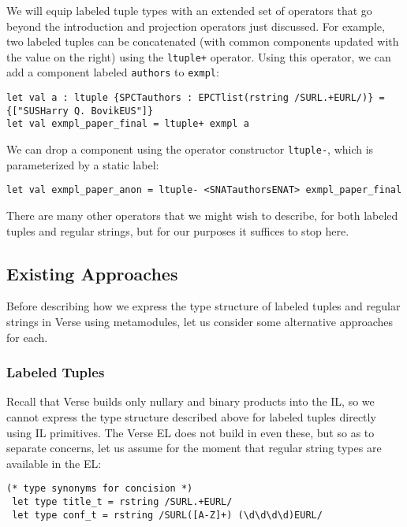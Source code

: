 We will equip labeled tuple types with an extended set of operators that go beyond the introduction and projection operators just discussed. For example, two labeled tuples can be concatenated (with common components updated with the value on the right) using the \lstinline{ltuple+} operator. Using this operator, we can add a component labeled \lstinline{authors} to \lstinline{exmpl}:
\begin{lstlisting}[numbers=none]
let val a : ltuple {SPCTauthors : EPCTlist(rstring /SURL.+EURL/)} = {["SUSHarry Q. BovikEUS"]}
let val exmpl_paper_final = ltuple+ exmpl a
\end{lstlisting}
We can drop a component using the operator constructor \lstinline{ltuple-}, which is parameterized by a static label:
\begin{lstlisting}[numbers=none]
let val exmpl_paper_anon = ltuple- <SNATauthorsENAT> exmpl_paper_final
\end{lstlisting}
There are many other operators that we might wish to describe, for both labeled tuples and regular strings, but for our purposes it suffices to stop here.

\subsection{Existing Approaches}\label{sec:metamodules-related}
Before describing how we express the type structure of labeled tuples and regular strings in Verse using metamodules, let us consider some alternative approaches for each.

\subsubsection{Labeled Tuples}
Recall that Verse builds only nullary and binary products into the IL, so we cannot express the type structure described above for labeled tuples  directly using IL primitives. The Verse EL does not build in even these, but so as to separate concerns, let us assume for the moment that regular string types are available in the EL: %
\begin{lstlisting}[numbers=none]
 (* type synonyms for concision *)
 let type title_t = rstring /SURL.+EURL/
 let type conf_t = rstring /SURL([A-Z]+) (\d\d\d\d)EURL/
\end{lstlisting}

